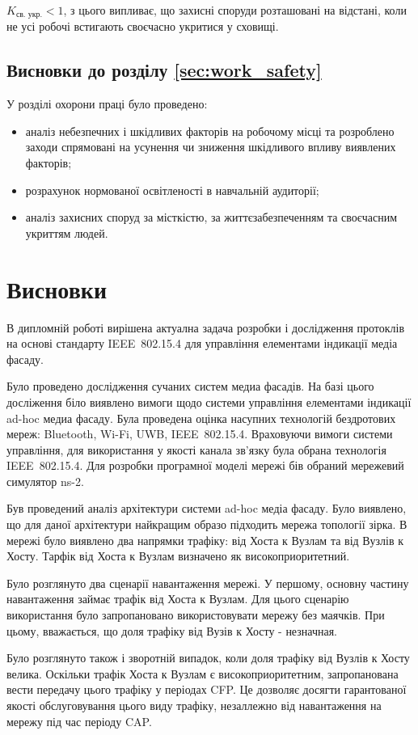 \documentclass[a4paper,ukrainian,utf8,nocolumnsxix,floatsection,equationsection]{eskdtext}
\let\stdsection\section
\renewcommand\section{\clearpage\stdsection}
\newcommand{\sectionnonum}[1]{\section*{#1}\addcontentsline{toc}{section}{#1}}
\newcommand{\iee}[0]{IEEE~802.15.4\xspace}
\begin{document}
$K_\text{св. укр.} < 1$, з цього випливає, що захисні споруди розташовані на відстані, коли не усі робочі встигають своєчасно укритися у сховищі.

\subsection{Висновки до розділу \ref{sec:work_safety}}

У розділі охорони праці було проведено:

\begin{itemize}
	\item аналіз небезпечних і шкідливих факторів на робочому місці та розроблено заходи спрямовані на усунення чи зниження шкідливого впливу виявлених факторів;
	\item розрахунок нормованої освітленості в навчальній аудиторії;
	\item аналіз захисних споруд за місткістю, за життєзабезпеченням та своєчасним укриттям людей. 
\end{itemize}



\sectionnonum{Висновки}

В дипломній роботі вирішена актуална задача розробки і дослідження протоклів на основі стандарту \iee для управління елементами індикації медіа фасаду.

Було проведено дослідження сучаних систем медиа фасадів. На базі цього досліження біло виявлено вимоги щодо системи управління елементами індикації ad-hoc медиа фасаду. Була проведена оцінка насупних технологій бездротових мереж: Bluetooth, Wi-Fi, UWB, \iee. Враховуючи вимоги системи управління, для використання у якості канала зв’язку була обрана технологія \iee. Для розробки програмної моделі мережі бів обраний мережевий симулятор ns-2.

Був проведений аналіз архітектури системи ad-hoc медіа фасаду. Було виявлено, що для даної архітектури найкращим образо підходить мережа топології зірка. В мережі було виявлено два напрямки трафіку: від Хоста к Вузлам та від Вузлів к Хосту. Тарфік від Хоста к Вузлам визначено як високоприоритетний.

Було розглянуто два сценарії навантаження мережі. У першому, основну частину навантаження займає трафік від Хоста к Вузлам. Для цього сценарію використання було запропановано використовувати мережу без маячків. При цьому, вважається, що доля трафіку від Вузів к Хосту - незначная.

Було розглянуто також і зворотній випадок, коли доля трафіку від Вузлів к Хосту велика. Оскільки трафік Хоста к Вузлам є високоприоритетним, запропанована вести передачу цього трафіку у періодах CFP. Це дозволяє досягти гарантованої якості обслуговування цього виду трафіку, незаллежно від навантаження на мережу під час періоду CAP.
\end{document}
